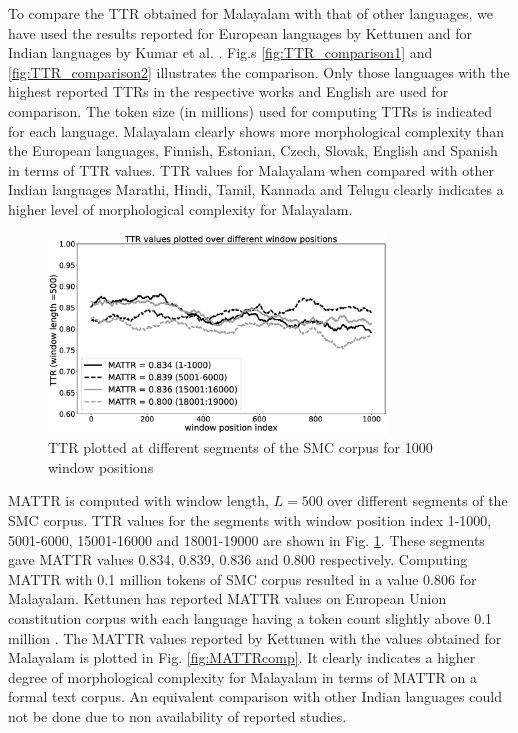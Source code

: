 To compare the TTR obtained for Malayalam with that of other languages, we have
used the results reported for European languages by Kettunen and for Indian
languages by Kumar et al. \cite{kettunen2014can,bharadwaja2007statistical}.
Fig.s \ref{fig:TTR_comparison1} and \ref{fig:TTR_comparison2} illustrates the
comparison. Only those languages with the highest reported TTRs in the
respective works and English are used for comparison. The token size (in
millions) used for computing TTRs  is indicated for each
language. Malayalam clearly shows more morphological complexity than the
European languages, Finnish, Estonian, Czech, Slovak, English and Spanish in
terms of TTR values. TTR values for Malayalam when compared with
other Indian languages Marathi, Hindi, Tamil, Kannada and Telugu clearly indicates a
higher level of morphological complexity for Malayalam.



\begin{figure}[htpb]
	\begin{center}

		\includegraphics[width=0.8\textwidth]{tsd1030d.eps}
		\caption{TTR plotted at different segments of the SMC corpus for 1000 window positions}
		\label{fig:MATTRfig}

	\end{center}
\end{figure}

MATTR is computed with window length, $L=500$ over different segments of the
SMC corpus. TTR values for the segments with window position index
1-1000, 5001-6000, 15001-16000 and 18001-19000 are shown in Fig.
\ref{fig:MATTRfig}. These segments gave MATTR values 0.834, 0.839, 0.836 and 0.800
respectively. Computing MATTR with 0.1 million tokens of SMC corpus
resulted in a value 0.806 for Malayalam. Kettunen has reported MATTR values on
 European Union constitution corpus with each language having a token
count slightly above 0.1 million \cite{kettunen2014can}. The MATTR values reported by Kettunen with the values obtained for Malayalam is
plotted in Fig. \ref{fig:MATTRcomp}. It clearly indicates a higher degree of
morphological complexity for Malayalam in terms of MATTR on a formal text
corpus. An equivalent comparison with other Indian languages could not be done
due to non availability of reported studies.

